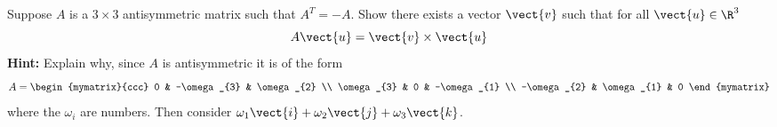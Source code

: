 \begin{enumialphparenastyle}
\begin{ex} Suppose $A$ is a $3\times 3$ antisymmetric matrix such that $A^{T}=-A$. Show
there exists a vector $\vect{v}$ such that for all $\vect{u}\in
\R^{3}$
\begin{equation*}
A\vect{u}=\vect{v} \times \vect{u}
\end{equation*}
\textbf{Hint: }Explain why, since $A$ is antisymmetric it is of the form
\begin{equation*}
A=\begin{mymatrix}{ccc}
0 & -\omega _{3} & \omega _{2} \\
\omega _{3} & 0 & -\omega _{1} \\
-\omega _{2} & \omega _{1} & 0
\end{mymatrix}
\end{equation*}
where the $\omega _{i}$ are numbers. Then consider $\omega _{1}\vect{i}
+\omega _{2}\vect{j}+\omega _{3}\vect{k}$.
\end{ex}

\end{enumialphparenastyle}